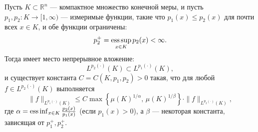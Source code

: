 \documentclass[../NDCNNAI_main.tex]{subfiles}
\begin{document}
\begin{theorem}
Пусть \( K \subset \mathbb{R}^n \) --- компактное множество конечной меры, и пусть \( p_1, p_2 \colon K \to [1, \infty) \) --- измеримые функции, такие что \( p_1(x) \leq p_2(x) \) для почти всех \( x \in K \), и обе функции ограничены:
\[
p_2^+ = \operatorname*{ess\,sup}_{x \in K} p_2(x) < \infty.
\]
Тогда имеет место непрерывное вложение:
\[
L^{p_2(\cdot)}(K) \subset L^{p_1(\cdot)}(K),
\]
и существует константа \( C = C(K, p_1, p_2) > 0 \) такая, что для любой \( f \in L^{p_2(\cdot)}(K) \) выполняется
\[
\| f \|_{L^{p_1(\cdot)}(K)} \leq C \max\left\{ \mu(K)^{1/\alpha}, \, \mu(K)^{1/\beta} \right\} \cdot \| f \|_{L^{p_2(\cdot)}(K)},
\]
где \( \alpha = \operatorname*{ess\,inf}_{x \in K} \frac{p_2(x)}{p_1(x)} \) (если \( p_1(x) > 0 \)), а \( \beta \) --- некоторая константа, зависящая от \( p_1^+, p_2^+ \).
\end{theorem}
\end{document}
